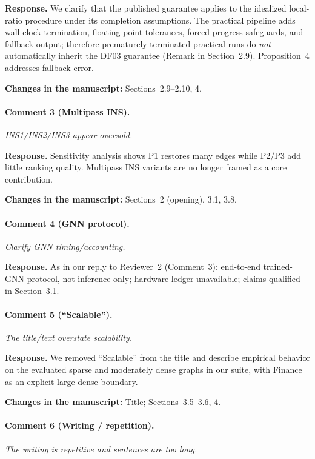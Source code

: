 \documentclass[11pt]{article}
\newcommand{\commentbox}[1]{\par\textit{#1}\par\medskip}
\newcommand{\changes}[1]{\textbf{Changes in the manuscript:} #1\par\medskip}
\begin{document}
\noindent\textbf{Response.}
We clarify that the published guarantee applies to the idealized local-ratio procedure under its completion assumptions. The practical pipeline adds wall-clock termination, floating-point tolerances, forced-progress safeguards, and fallback output; therefore prematurely terminated practical runs do \emph{not} automatically inherit the DF03 guarantee (Remark in Section~2.9). Proposition~4 addresses fallback error.

\changes{Sections~2.9--2.10, 4.}

\paragraph{Comment 3 (Multipass INS).}
\commentbox{INS1/INS2/INS3 appear oversold.}

\noindent\textbf{Response.}
Sensitivity analysis shows P1 restores many edges while P2/P3 add little ranking quality. Multipass INS variants are no longer framed as a core contribution.

\changes{Sections~2 (opening), 3.1, 3.8.}

\paragraph{Comment 4 (GNN protocol).}
\commentbox{Clarify GNN timing/accounting.}

\noindent\textbf{Response.}
As in our reply to Reviewer~2 (Comment~3): end-to-end trained-GNN protocol, not inference-only; hardware ledger unavailable; claims qualified in Section~3.1.

\paragraph{Comment 5 (``Scalable'').}
\commentbox{The title/text overstate scalability.}

\noindent\textbf{Response.}
We removed ``Scalable'' from the title and describe empirical behavior on the evaluated sparse and moderately dense graphs in our suite, with Finance as an explicit large-dense boundary.

\changes{Title; Sections~3.5--3.6, 4.}

\paragraph{Comment 6 (Writing / repetition).}
\commentbox{The writing is repetitive and sentences are too long.}
\end{document}
